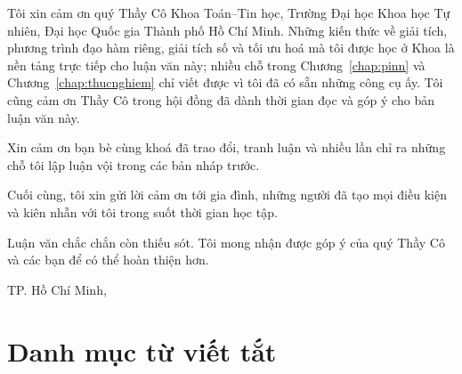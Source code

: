 Tôi xin cảm ơn quý Thầy Cô Khoa Toán--Tin học, Trường Đại học Khoa học Tự nhiên,
Đại học Quốc gia Thành phố Hồ Chí Minh. Những kiến thức về giải tích, phương
trình đạo hàm riêng, giải tích số và tối ưu hoá mà tôi được học ở Khoa là nền
tảng trực tiếp cho luận văn này; nhiều chỗ trong Chương~\ref{chap:pinn} và
Chương~\ref{chap:thucnghiem} chỉ viết được vì tôi đã có sẵn những công cụ ấy.
Tôi cũng cảm ơn Thầy Cô trong hội đồng đã dành thời gian đọc và góp ý cho bản
luận văn này.

Xin cảm ơn bạn bè cùng khoá đã trao đổi, tranh luận và nhiều lần chỉ ra những
chỗ tôi lập luận vội trong các bản nháp trước.

Cuối cùng, tôi xin gửi lời cảm ơn tới gia đình, những người đã tạo mọi điều kiện
và kiên nhẫn với tôi trong suốt thời gian học tập.

Luận văn chắc chắn còn thiếu sót. Tôi mong nhận được góp ý của quý Thầy Cô và
các bạn để có thể hoàn thiện hơn.

\vspace{1cm}
\begin{flushright}
\begin{minipage}{8.6cm}
\centering
TP. Hồ Chí Minh, \\[0.3cm]
\thesisAuthor
\end{minipage}
\end{flushright}

\chapter*{Danh mục từ viết tắt}

